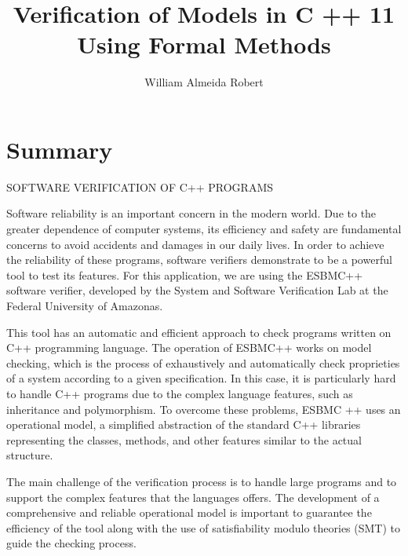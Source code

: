 \documentclass[11pt]{article}
\begin{document}
%
\author{William Almeida Robert}
\title{Verification of Models in C ++ 11  Using Formal Methods}
\maketitle

\section{Summary}

\begin{center} SOFTWARE VERIFICATION OF C++ PROGRAMS\end{center}

\setlength{\parindent}{10ex} Software reliability is an important concern in the modern world. Due to the greater dependence of computer systems, its efficiency and safety are fundamental concerns to avoid accidents and damages in our daily lives. In order to achieve the reliability of these programs, software verifiers demonstrate to be a powerful tool to test its features. For this application, we are using the ESBMC++ software verifier, developed by the System and Software Verification Lab at the Federal University of Amazonas. \par 

\setlength{\parindent}{10ex}This tool has an automatic and efficient approach to check programs written on C++ programming language.
	The operation of ESBMC++ works on model checking, which is the process of exhaustively and automatically check proprieties of a system according to a given specification. In this case, it is particularly hard to handle C++ programs due to the complex language features, such as inheritance and polymorphism. To overcome these problems, ESBMC ++ uses an operational model, a simplified abstraction of the standard C++ libraries representing the classes, methods, and other features similar to the actual structure.\par 
\setlength{\parindent}{10ex}The main challenge of the verification process is to handle large programs and to support the complex features that the languages offers. The development of a comprehensive and reliable operational model is important to guarantee the efficiency of the tool along with the use of satisﬁability modulo theories (SMT) to guide the checking process.\par 
\end{document}
